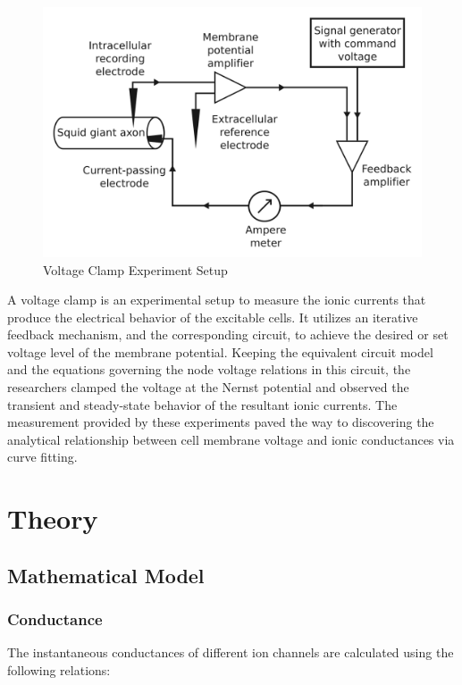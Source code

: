 \documentclass{IEEEtran}
\begin{document}
\begin{figure}[h]
\centering
\includegraphics[width=\textwidth]{VCE.png}
\caption{Voltage Clamp Experiment Setup}\label{fig:vce}
\end{figure}

A voltage clamp is an experimental setup to measure the ionic currents that produce the electrical behavior of the excitable cells. It utilizes an iterative feedback mechanism, and the corresponding circuit, to achieve the desired or set voltage level of the membrane potential. Keeping the equivalent circuit model  and the equations governing the node voltage relations in this circuit, the researchers clamped the voltage at the Nernst potential and observed the transient and steady-state behavior of the resultant ionic currents. The measurement provided by these experiments paved the way to discovering the analytical relationship between cell membrane voltage and ionic conductances via curve fitting. 

\section{Theory}

\subsection{Mathematical Model}
\subsubsection*{Conductance}
The instantaneous conductances of different ion channels are calculated using the following relations:
\end{document}
